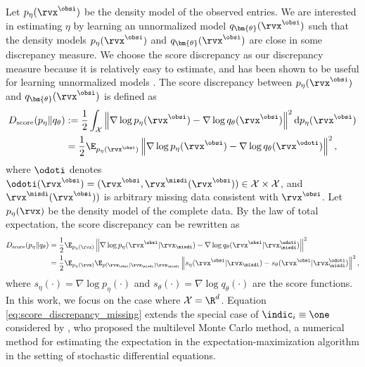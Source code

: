 Let $p_{\eta}(\rvx^{\obsi})$ be the density model of the observed entries. We are interested in estimating $\eta$ by learning an unnormalized model $q_{\bm{\theta}}(\rvx^{\obsi})$ such that the density models $p_{\eta}(\rvx^{\obsi})$ and $q_{\bm{\theta}}(\rvx^{\obsi})$ are close in some discrepancy measure. We choose the score discrepancy as our discrepancy measure because it is relatively easy to estimate, and has been shown to be useful for learning unnormalized models \citep{Wang2016, Song2019}. The score discrepancy between $p_{\eta}(\rvx^{\obsi})$ and $q_{\bm{\theta}}(\rvx^{\obsi})$ is defined as \citep{Rhee2015, Song2019}
\begin{align}
	D_{\text{score}}(p_{\eta} \| q_{\theta}) &:= \frac{1}{2} \int_{\mathcal{X}} \left\| \nabla \log p_{\eta}(\rvx^{\obsi}) - \nabla \log q_{\theta}(\rvx^{\obsi}) \right\|^{2} \mathrm{d} p_{\eta}(\rvx^{\obsi}) \notag \\ 
	& = \frac{1}{2} \E_{p_{\eta}(\rvx^{\obsi})} \left\| \nabla \log p_{\eta}(\rvx^{\obsi}) - \nabla \log q_{\theta}(\rvx^{\odoti}) \right\|^{2}, \label{eq:score_discrepancy}
\end{align}
where $\odoti$ denotes $\odoti(\rvx^{\obsi}) = (\rvx^{\obsi}, \rvx^{\misdi}(\rvx^{\obsi})) \in \mathcal{X} \times \mathcal{X}$, and $\rvx^{\misdi}(\rvx^{\obsi}))$ is arbitrary missing data consistent with $\rvx^{\obsi}$.
Let $p_{\eta}(\rvx)$ be the density model of the complete data. By the law of total expectation, the score discrepancy can be rewritten as 
\begin{align}
	D_{\text{score}}(p_{\eta} \| q_{\theta}) &= \frac{1}{2} \E_{p_{\eta}(\rvx)} \left\| \nabla \log p_{\eta}(\rvx^{\obsi} | \rvx_{\misdi}) - \nabla \log q_{\theta}(\rvx^{\obsi} | \rvx_{\misdi}^{\odoti}) \right\|^{2} \notag \\ 
	& = \frac{1}{2} \E_{p_{\eta}(\rvx)} \E_{p(\rvx_{\obsi} | \rvx_{\misdi}) \rvx_{\misdi}} \left\| s_{\eta}(\rvx^{\obsi} | \rvx_{\misdi}) - s_{\theta}(\rvx^{\obsi} | \rvx_{\misdi}^{\odoti}) \right\|^{2}, \label{eq:score_discrepancy_missing}
\end{align}
where $s_{\eta}(\cdot) = \nabla \log p_{\eta}(\cdot)$ and $s_{\theta}(\cdot) = \nabla \log q_{\theta}(\cdot)$ are the score functions. In this work, we focus on the case where $\mathcal{X} = \R^{d}$. Equation \eqref{eq:score_discrepancy_missing} extends the special case of $\indic_{i} \equiv \one$ considered by \citet{Giles2008}, who proposed the multilevel Monte Carlo method, a numerical method for estimating the expectation in the expectation-maximization algorithm in the setting of stochastic differential equations.

